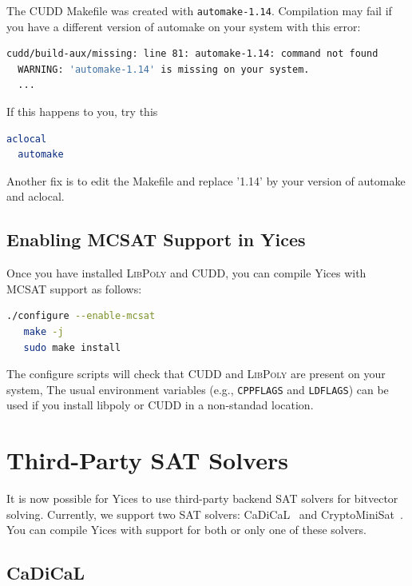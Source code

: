 \documentclass[11pt,twoside,fleqn,openright,titlepage]{cslreport}
\begin{document}
\medskip\noindent
The CUDD Makefile was created with \texttt{automake-1.14}. Compilation may fail if you
have a different version of automake on your system with this error:
\begin{small}
\begin{lstlisting}[language=sh]
  cudd/build-aux/missing: line 81: automake-1.14: command not found
  WARNING: 'automake-1.14' is missing on your system.
  ...
\end{lstlisting}
\end{small}
If this happens to you, try this
\begin{small}
\begin{lstlisting}[language=sh]
  aclocal
  automake
\end{lstlisting}
\end{small}
Another fix is to edit the Makefile and replace '1.14' by your version of automake and aclocal.


\subsection*{Enabling MCSAT Support in Yices}
Once you have installed \textsc{LibPoly} and CUDD, you can compile Yices with MCSAT
support as follows:
\begin{small}
\begin{lstlisting}[language=sh]
   ./configure --enable-mcsat
   make -j
   sudo make install
\end{lstlisting}
\end{small}
The configure scripts will check that CUDD and \textsc{LibPoly} are present on your system,
The usual environment variables (e.g., \texttt{CPPFLAGS} and
\texttt{LDFLAGS}) can be used if you install libpoly or CUDD in a non-standad
location.

\section{Third-Party SAT Solvers}

It is now possible for Yices to use third-party backend SAT solvers
for bitvector solving. Currently, we support two SAT solvers:
CaDiCaL~\cite{Biere:cadical:2019} and
CryptoMiniSat~\cite{Soos+etal:extending:2009}. You can compile Yices
with support for both or only one of these solvers.

\subsection*{CaDiCaL}
\end{document}
